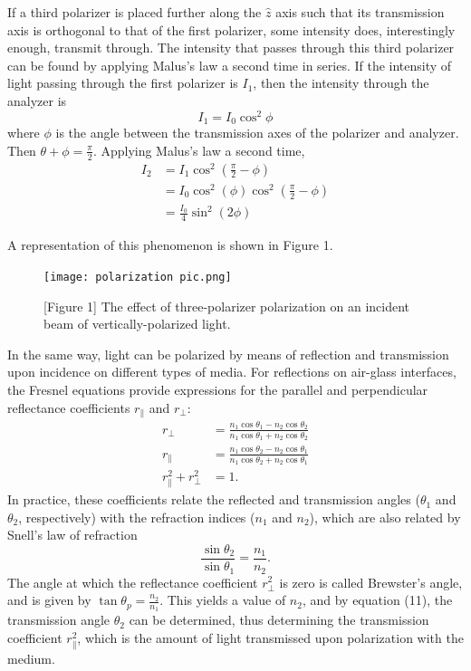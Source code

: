 \documentclass[11pt]{article}
\begin{document}
\begin{multicols}{2}
    If a third polarizer is placed further along the $\hat{z}$ axis such that its transmission axis is orthogonal to that of the first polarizer, some intensity does, interestingly enough, transmit through. The intensity that passes through this third polarizer can be found by applying Malus's law a second time in series. If the intensity of light passing through the first polarizer is $I_1$, then the intensity through the analyzer is
    \[
        I_1 = I_0 \cos^2 \phi \tag{8}
    \]
    where $\phi$ is the angle between the transmission axes of the polarizer and analyzer. Then $\theta+\phi = \frac{\pi}{2}$. Applying Malus's law a second time,
    \begin{align*}
        I_2 &= I_1 \cos^2 \left(\frac{\pi}{2} - \phi\right) \tag{9.1}\\
        &= I_0 \cos^2 (\phi) \cos^2 \left(\frac{\pi}{2} - \phi\right) \tag{9.2}\\
        & = \frac{I_0}{4} \sin^2 (2 \phi) \tag{9.3}
    \end{align*}
           
    \nd A representation of this phenomenon is shown in Figure 1.

    \begin{figure}[H]
        \centering
        \texttt{[image: polarization pic.png]}
        \caption*{[Figure 1] The effect of three-polarizer polarization on an incident beam of vertically-polarized light. }
    \end{figure}
    
    In the same way, light can be polarized by means of reflection and transmission upon incidence on different types of media. For reflections on air-glass interfaces, the Fresnel equations provide expressions for the parallel and perpendicular reflectance coefficients $r_{\parallel}$ and $r_{\perp}$:
    \begin{align*}
        r_{\perp} &= \frac{n_1\cos\theta_1 - n_2\cos\theta_2}{n_1\cos\theta_1 + n_2\cos\theta_2} \tag{10.1}\\
        r_{\parallel} &= \frac{n_1\cos\theta_2 - n_2\cos\theta_1}{n_1\cos\theta_2 + n_2\cos\theta_1} \tag{10.2}\\
        r_{\parallel}^2 + r_{\perp}^2 &= 1. \tag{10.3}
    \end{align*}
    \nd In practice, these coefficients relate the reflected and transmission angles ($\theta_1$ and $\theta_2$, respectively) with the refraction indices ($n_1$ and $n_2$), which are also related by Snell's law of refraction 
    \[\frac{\sin\theta_2}{\sin\theta_1} = \frac{n_1}{n_2}.\tag{11}\] 
    \nd The angle at which the reflectance coefficient $r_{\perp}^2$ is zero is called Brewster's angle, and is given by $\tan\theta_p = \frac{n_2}{n_1}$. This yields a value of $n_2$, and by equation (11), the transmission angle $\theta_2$ can be determined, thus determining the transmission coefficient $r_{\parallel}^2$, which is the amount of light transmissed upon polarization with the medium. 


\end{multicols}
\end{document}
